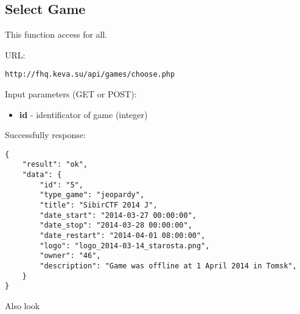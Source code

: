 \subsection{Select Game}
\par

This function access for all.

URL:
\begin{Verbatim}[frame=single]
http://fhq.keva.su/api/games/choose.php
\end{Verbatim}

Input parameters (GET or POST):
\begin{itemize}
  \item \textbf{id} - identificator of game (integer)
\end{itemize}

Successfully response:  \\
\begin{Verbatim}[frame=single]
{
    "result": "ok",
    "data": {
        "id": "5",
        "type_game": "jeopardy",
        "title": "SibirCTF 2014 J",
        "date_start": "2014-03-27 00:00:00",
        "date_stop": "2014-03-28 00:00:00",
        "date_restart": "2014-04-01 08:00:00",
        "logo": "logo_2014-03-14_starosta.png",
        "owner": "46",
        "description": "Game was offline at 1 April 2014 in Tomsk",
    }
}
\end{Verbatim}

Also look ~

